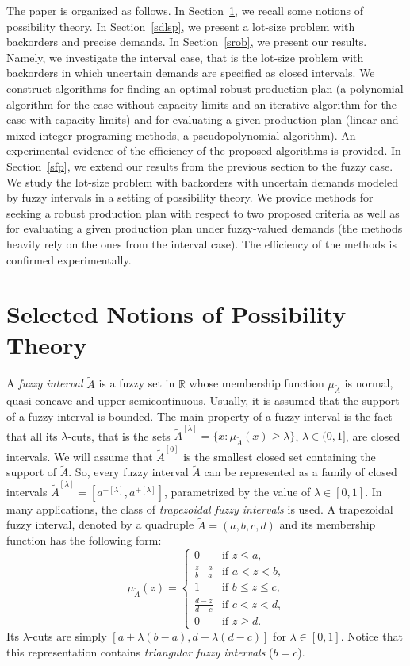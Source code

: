 \documentclass[11pt]{article}
\newcommand{\Rset}{\mathbb{R}}
\begin{document}
The paper is organized as follows. In
Section~\ref{ssnpt}, we recall some 
notions of possibility theory.  In
Section~\ref{sdlsp}, we present 
a lot-size problem with backorders and precise demands. 
In Section~\ref{srob}, we present our results. Namely, we
 investigate the interval case, that is the lot-size problem with backorders
in which uncertain demands are specified as closed intervals. We construct
 algorithms  for 
 finding an optimal robust production plan (a polynomial algorithm for the case without
 capacity limits and an iterative algorithm for the case with capacity limits)
 and for
 evaluating a given production plan (linear and mixed integer programing methods,
 a pseudopolynomial algorithm).
 An experimental evidence of the efficiency of the proposed algorithms is provided.
 In Section~\ref{sfp}, we extend our results from the previous section to the fuzzy case.
 We study the lot-size problem with backorders with uncertain
 demands modeled by fuzzy intervals in a setting of possibility theory.
 We provide methods for seeking a  robust production plan
 with respect to two proposed criteria as well as for evaluating a given production plan
under fuzzy-valued demands (the methods heavily rely on the ones from the interval case).
 The efficiency of the methods is confirmed experimentally. 

\section{Selected Notions of Possibility Theory}
\label{ssnpt}

A \emph{fuzzy interval} $\widetilde{A}$ is a fuzzy set in $\Rset$ whose membership function $\mu_{\widetilde{A}}$ is normal, quasi concave and upper semicontinuous. Usually, it is  assumed that the support of a fuzzy interval  is bounded. The main property of a fuzzy interval is the fact that all its $\lambda$-cuts, that is the sets $\widetilde{A}^{[\lambda]}=\{x:\mu_{\widetilde{A}}(x)\geq \lambda\}$, $\lambda \in (0,1]$, are closed intervals. We will assume that $\widetilde{A}^{[0]}$ is the smallest closed set containing the support of $\widetilde{A}$. So, every fuzzy interval $\widetilde{A}$ can be represented as a family of closed intervals $\widetilde{A}^{[\lambda]}=[a^{-[\lambda]},a^{+[\lambda]}]$, parametrized by the value of $\lambda\in [0,1]$. In many applications, the class of \emph{trapezoidal fuzzy intervals} is used.
 A trapezoidal fuzzy interval, denoted by a quadruple $\widetilde{A}=(a,b,c,d)$
 and  its membership function has the following form:
 \[
\mu_{\widetilde{A}}(z)=
\begin{cases}
	0 &\text{if $z\leq a$,}\\
	 \frac{z-a}{b-a} &\text{if $a< z < b $,}\\
	 1 &\text{if $b\leq z \leq c $,}\\
	 \frac{d-z}{d-c} &\text{if $c< z < d $,}\\
	 0 &\text{if $z\geq d$.}
\end{cases}
\]
Its  $\lambda$-cuts are simply
$[a+\lambda(b-a), d-\lambda (d-c)]$ for $\lambda\in [0,1]$. Notice that this representation contains  \emph{triangular fuzzy intervals}  ($b=c$).
 
\end{document}
